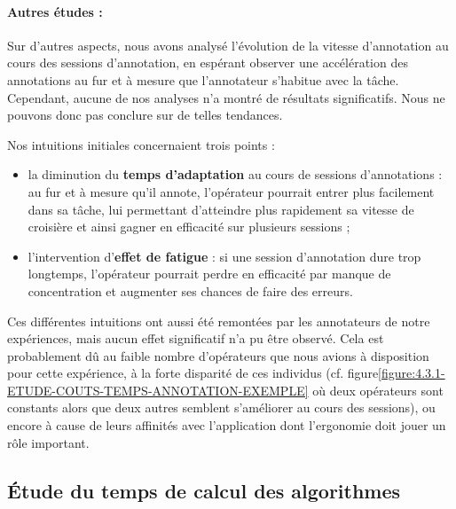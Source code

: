 			\paragraph{Autres études :}
			Sur d'autres aspects, nous avons analysé l'évolution de la vitesse d'annotation au cours des sessions d'annotation, en espérant observer une accélération des annotations au fur et à mesure que l'annotateur s'habitue avec la tâche. Cependant, aucune de nos analyses n'a montré de résultats significatifs. Nous ne pouvons donc pas conclure sur de telles tendances.
			\begin{leftBarAuthorOpinion}
				Nos intuitions initiales concernaient trois points :
				\begin{itemize}
					\item la diminution du \textbf{temps d'adaptation} au cours de sessions d'annotations : au fur et à mesure qu'il annote, l'opérateur pourrait entrer plus facilement dans sa tâche, lui permettant d'atteindre plus rapidement sa vitesse de croisière et ainsi gagner en efficacité sur plusieurs sessions ;
					\item l'intervention d'\textbf{effet de fatigue} : si une session d'annotation dure trop longtemps, l'opérateur pourrait perdre en efficacité par manque de concentration et augmenter ses chances de faire des erreurs.
				\end{itemize}
				Ces différentes intuitions ont aussi été remontées par les annotateurs de notre expériences, mais aucun effet significatif n'a pu être observé. Cela est probablement dû au faible nombre d'opérateurs que nous avions à disposition pour cette expérience, à la forte disparité de ces individus (cf. figure\ref{figure:4.3.1-ETUDE-COUTS-TEMPS-ANNOTATION-EXEMPLE} où deux opérateurs sont constants alors que deux autres semblent s'améliorer au cours des sessions), ou encore à cause de leurs affinités avec l'application dont l'ergonomie doit jouer un rôle important.
			\end{leftBarAuthorOpinion}
	

	\subsection{Étude du temps de calcul des algorithmes}
	\label{section:4.3.2-ETUDE-COUTS-TEMPS-CALCUL}
	
